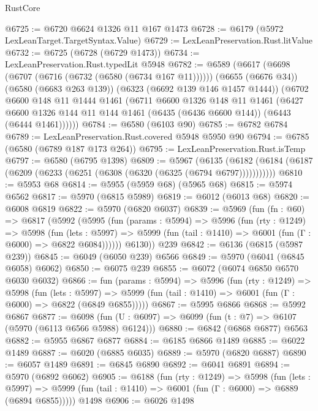 \begin{lexlean}{RustCore}
\begin{coremodule}
{\begin{coremodule}
{{{{{{{{{{{{{{{{{{{{{{{{{{{{{{{{{{{{{{{{{{{{{@6725 := @6720 @6624 @1326 @11 @167 @1473
@6728 := @6179 (@5972 LexLeanTarget.TargetSyntax.Value)
@6729 := LexLeanPreservation.Rust.litValue
@6732 := @6725 (@6728 (@6729 @1473))
@6734 := LexLeanPreservation.Rust.typedLit @5948
@6782 := @6589
    (@6617
      (@6698 (@6707 (@6716 (@6732 (@6580 (@6734 @167 @11))))))
      (@6655 (@6676 @34))
      (@6580 (@6683 @263 @139))
      (@6323 (@6692 @139 @146 @1457 @1444))
      (@6702
        @6600
        @148
        @11
        @1444
        @1461
        (@6711
          @6600
          @1326
          @148
          @11
          @1461
          (@6427
            @6600
            @1326
            @144
            @11
            @144
            @1461
            (@6435 (@6436 @6600 @144))
            (@6443 (@6444 @1461))))))
@6784 := @6580 (@6103 @90)
@6785 := @6782 @6784
@6789 := LexLeanPreservation.Rust.covered @5948 @5950 @90
@6794 := @6785 (@6580 (@6789 @187 @173 @264))
@6795 := LexLeanPreservation.Rust.isTemp
@6797 := @6580 (@6795 @1398)
@6809 := @5967
    (@6135 (@6182 (@6184 (@6187 (@6209 (@6233 (@6251 (@6308 (@6320 (@6325 (@6794 @6797)))))))))))
@6810 := @5953 @68
@6814 := @5955 (@5959 @68) (@5965 @68)
@6815 := @5974 @6562
@6817 := @5970 (@6815 @5989)
@6819 := @6012 (@6013 @68)
@6820 := @6008 @6819
@6822 := @5970 (@6820 @6037)
@6839 := @5969
    (fun (fn : @60) =>
    @6817
      (@5992
        (@5995
          (fun (params : @5994) =>
          @5996
            (fun (rty : @1249) =>
            @5998
              (fun (lets : @5997) =>
              @5999 (fun (tail : @1410) => @6001 (fun (Γ : @6000) => @6822 @6084))))))
        @6130))
    @239
@6842 := @6136 (@6815 (@5987 @239))
@6845 := @6049 (@6050 @239) @6566
@6849 := @5970 (@6041 (@6845 @6058) @6062)
@6850 := @6075 @239
@6855 := @6072 (@6074 @6850 @6570 @6030 @6032)
@6866 := fun (params : @5994) =>
  @5996
    (fun (rty : @1249) =>
    @5998
      (fun (lets : @5997) =>
      @5999 (fun (tail : @1410) => @6001 (fun (Γ : @6000) => @6822 (@6849 @6855)))))
@6867 := @5995 @6866
@6868 := @5992 @6867
@6877 := @6098 (fun (U : @6097) => @6099 (fun (t : @7) => @6107 (@5970 (@6113 @6566 @5988) @6124)))
@6880 := @6842 (@6868 @6877) @6563
@6882 := @5955 @6867 @6877
@6884 := @6185 @6866 @1489
@6885 := @6022 @1489
@6887 := @6020 (@6885 @6035)
@6889 := @5970 (@6820 @6887)
@6890 := @6057 @1489
@6891 := @6845 @6890
@6892 := @6041 @6891
@6894 := @5970 (@6892 @6062)
@6905 := @6188
    (fun (rty : @1249) =>
    @5998
      (fun (lets : @5997) =>
      @5999 (fun (tail : @1410) => @6001 (fun (Γ : @6000) => @6889 (@6894 @6855)))))
    @1498
@6906 := @6026 @1498
}}}}}}}}}}}}}}}}}}}}}}}}}}}}}}}}}}}}}}}}}}}}}
\end{coremodule}}
\end{coremodule}
\end{lexlean}
